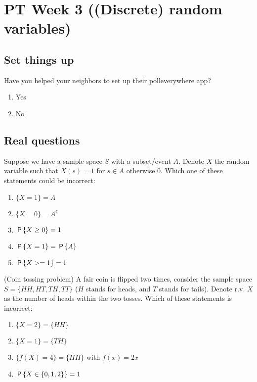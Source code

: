 \documentclass[poll_tutorial_format]{subfiles}
\begin{document}
	\maketitle
		\setcounter{section}{2}
	\section{PT Week 3 ((Discrete) random variables)}
	
	\subsection{Set things up}
	\label{sec:set-things-up}
	
	
	
	\setcounter{theorem}{-1}
	
	\begin{exercise}
		Have you helped your neighbors to set up their polleverywhere app? 
		\begin{enumerate}
			\item Yes
			\item No
		\end{enumerate}
	\end{exercise}
	
	\subsection{Real questions}
	\label{sec:start-real-questions pt week 3}
	\begin{exercise}
		Suppose we have a sample space $S$ with a subset/event $A$. Denote $X$ the random variable such that $X(s)=1$ for $s\in A$ otherwise $0$. 
		Which one of these statements could be incorrect:
		\begin{enumerate}
			\item $\{X=1\}=A$
			\item $\{X=0\}=A^c$
			\item $\P{X\geq 0}=1$
			\item $\P{X=1}=\P{A}$
			\item $\P{X>=1}=1$ 
		\end{enumerate}
	\end{exercise}


	\begin{exercise}
	(Coin tossing problem) A fair coin is flipped two times, consider the sample space $S=\{HH, HT, TH, TT\}$ ($H$ stands for heads, and $T$ stands for tails). Denote r.v. $X$ as the number of heads within the two tosses.
	Which of these statements is incorrect: 
	\begin{enumerate}
		\item $\{X=2\}=\{HH\}$
		\item $ \{X=1\}=\{TH\}$
		\item $\{f(X) =4\} =\{HH\} $ with $f(x)=2x$
		\item $ \P{X\in \{0,1,2\}} =1$
	\end{enumerate}
\end{exercise}
\end{document}
